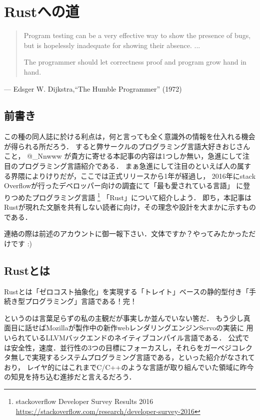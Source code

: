 \chapter{Rustへの道}
\begin{quotation}
  Program testing can be a very effective way to show the presence of bugs, \\
  but is hopelessly inadequate for showing their absence. ...

  The programmer should let correctness proof and program grow hand in hand.
\end{quotation}
\begin{flushright}
  --- Edsger W. Dijkstra,``The Humble Programmer'' (1972)
\end{flushright}

\section{前書き}
この種の同人誌に於ける利点は，何と言っても全く意識外の情報を仕入れる機会が得られる所だろう．
すると弊サークルのプログラミング言語大好きおじさんこと， @\_Nnwww が貴方に寄せる本記事の内容は1つしか無い，急進にして注目のプログラミング言語紹介である．
まぁ急進にして注目のといえば人の属する界隈によりけりだが，ここでは正式リリースから1年が経過し，
2016年にstack Overflowが行ったデベロッパー向けの調査にて「最も愛されている言語」
に登りつめたプログラミング言語
\footnote{stackoverflow Developer Survey Results 2016 \\
  \url{https://stackoverflow.com/research/developer-survey-2016}}
「Rust」について紹介しよう．
即ち，本記事はRustが現れた文脈を共有しない読者に向け，その理念や設計を大まかに示すものである．

連絡の際は前述のアカウントに御一報下さい．文体ですか？やってみたかっただけです :)

\section{Rustとは}
Rustとは「ゼロコスト抽象化」を実現する「トレイト」ベースの静的型付き「手続き型プログラミング」言語である！完！

というのは言葉足らずの私の主観だが事実しか並んでいない筈だ．
もう少し真面目に話せばMozillaが製作中の新作webレンダリングエンジンServoの実装に
用いられているLLVMバックエンドのネイティブコンパイル言語である．
公式では安全性，速度．並行性の3つの目標にフォーカスし，それらをガーベジコレクタ無しで実現するシステムプログラミング言語である，といった紹介がなされており，
レイヤ的にはこれまでC/C++のような言語が取り組んでいた領域に昨今の知見を持ち込む進捗だと言えるだろう．

